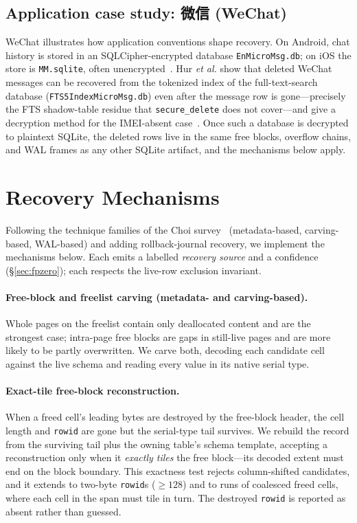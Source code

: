 \documentclass[10pt,a4paper]{article}
\newcommand{\zh}[1]{#1}
\newcommand{\code}[1]{\texttt{#1}}
\begin{document}
\subsection*{Application case study: \zh{微信} (WeChat)}
WeChat illustrates how application conventions shape recovery. On Android, chat
history is stored in an SQLCipher-encrypted database \code{EnMicroMsg.db}; on iOS
the store is \code{MM.sqlite}, often unencrypted~\cite{hur2020wechat}. Hur
\emph{et al.} show that deleted WeChat messages can be recovered from the tokenized
index of the full-text-search database (\code{FTS5IndexMicroMsg.db}) even after the
message row is gone---precisely the FTS shadow-table residue that
\code{secure\_delete} does not cover---and give a decryption method for the
IMEI-absent case~\cite{hur2020wechat}. Once such a database is decrypted to
plaintext SQLite, the deleted rows live in the same free blocks, overflow chains,
and WAL frames as any other SQLite artifact, and the mechanisms below apply.

\section{Recovery Mechanisms}\label{sec:mechanisms}

Following the technique families of the Choi survey~\cite{choi2025survey}
(metadata-based, carving-based, WAL-based) and adding rollback-journal recovery, we
implement the mechanisms below. Each emits a labelled \emph{recovery source} and a
confidence (\S\ref{sec:fpzero}); each respects the live-row exclusion invariant.

\paragraph{Free-block and freelist carving (metadata- and carving-based).}
Whole pages on the freelist contain only deallocated content and are the strongest
case; intra-page free blocks are gaps in still-live pages and are more likely to be
partly overwritten. We carve both, decoding each candidate cell against the live
schema and reading every value in its native serial type.

\paragraph{Exact-tile free-block reconstruction.}
When a freed cell's leading bytes are destroyed by the free-block header, the cell
length and \code{rowid} are gone but the serial-type tail survives. We rebuild the
record from the surviving tail plus the owning table's schema template, accepting a
reconstruction only when it \emph{exactly tiles} the free block---its decoded
extent must end on the block boundary. This exactness test rejects column-shifted
candidates, and it extends to two-byte \code{rowid}s ($\geq 128$) and to runs of
coalesced freed cells, where each cell in the span must tile in turn. The destroyed
\code{rowid} is reported as absent rather than guessed.
\end{document}

